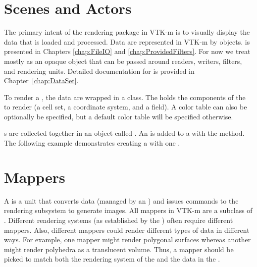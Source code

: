 


\section{Scenes and Actors}
\label{sec:Scene}
\label{sec:Actor}


The primary intent of the rendering package in VTK-m is to visually display
the data that is loaded and processed. Data are represented in VTK-m by
 objects.  is presented in
Chapters \ref{chap:FileIO} and \ref{chap:ProvidedFilters}. For now we treat
 mostly as an opaque object that can be passed
around readers, writers, filters, and rendering units. Detailed
documentation for  is provided in
Chapter~\ref{chap:DataSet}.

To render a , the data are wrapped in a
 class. The  holds the
components of the  to render (a cell set, a
coordinate system, and a field). A color table can also be optionally be
specified, but a default color table will be specified otherwise.



s are collected together in an object called
. An  is added to a
 with the  method. The following
example demonstrates creating a  with one
.




\section{Mappers}
\label{sec:Mapper}


A  is a unit that converts data (managed by an
) and issues commands to the rendering subsystem to
generate images. All mappers in VTK-m are a subclass of
. Different rendering systems (as established by the
) often require different mappers. Also, different
mappers could render different types of data in different ways. For
example, one mapper might render polygonal surfaces whereas another might
render polyhedra as a translucent volume. Thus, a mapper should be picked
to match both the rendering system of the  and the
data in the .

